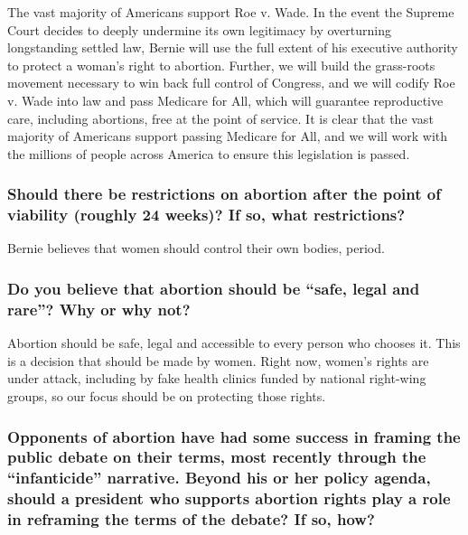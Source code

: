 The vast majority of Americans support Roe v. Wade. In the event the
Supreme Court decides to deeply undermine its own legitimacy by
overturning longstanding settled law, Bernie will use the full extent of
his executive authority to protect a woman's right to abortion. Further,
we will build the grass-roots movement necessary to win back full
control of Congress, and we will codify Roe v. Wade into law and pass
Medicare for All, which will guarantee reproductive care, including
abortions, free at the point of service. It is clear that the vast
majority of Americans support passing Medicare for All, and we will work
with the millions of people across America to ensure this legislation is
passed.

\hypertarget{should-there-be-restrictions-on-abortion-after-the-point-of-viability-roughly-24-weeks-if-so-what-restrictions-4}{%
\subsubsection{Should there be restrictions on abortion after the point
of viability (roughly 24 weeks)? If so, what
restrictions?}\label{should-there-be-restrictions-on-abortion-after-the-point-of-viability-roughly-24-weeks-if-so-what-restrictions-4}}

Bernie believes that women should control their own bodies, period.

\hypertarget{do-you-believe-that-abortion-should-be-safe-legal-and-rare-why-or-why-not-4}{%
\subsubsection{Do you believe that abortion should be ``safe, legal and
rare''? Why or why
not?}\label{do-you-believe-that-abortion-should-be-safe-legal-and-rare-why-or-why-not-4}}

Abortion should be safe, legal and accessible to every person who
chooses it. This is a decision that should be made by women. Right now,
women's rights are under attack, including by fake health clinics funded
by national right-wing groups, so our focus should be on protecting
those rights.

\hypertarget{opponents-of-abortion-have-had-some-success-in-framing-the-public-debate-on-their-terms-most-recently-through-the-infanticide-narrative-beyond-his-or-her-policy-agenda-should-a-president-who-supports-abortion-rights-play-a-role-in-reframing-the-terms-of-the-debate-if-so-how-4}{%
\subsubsection{Opponents of abortion have had some success in framing
the public debate on their terms, most recently through the
``infanticide'' narrative. Beyond his or her policy agenda, should a
president who supports abortion rights play a role in reframing the
terms of the debate? If so,
how?}\label{opponents-of-abortion-have-had-some-success-in-framing-the-public-debate-on-their-terms-most-recently-through-the-infanticide-narrative-beyond-his-or-her-policy-agenda-should-a-president-who-supports-abortion-rights-play-a-role-in-reframing-the-terms-of-the-debate-if-so-how-4}}

